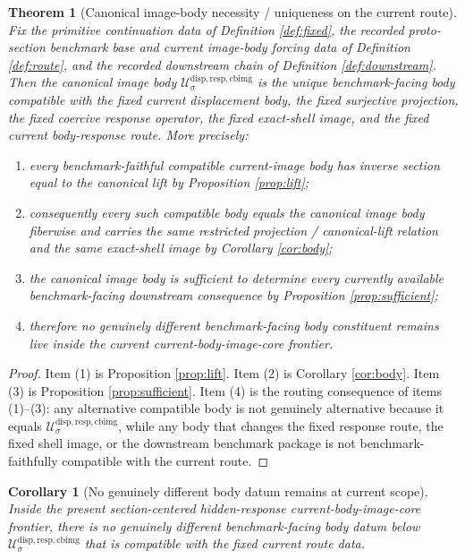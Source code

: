 \documentclass[11pt]{article}
\newcommand{\CanonicalImageBody}[1]{\mathcal U_{#1}^{\mathrm{disp,resp,cbimg}}}
\newtheorem{corollary}{Corollary}
\newtheorem{theorem}{Theorem}
\begin{document}
\begin{theorem}[Canonical image-body necessity / uniqueness on the current route]
\label{thm:main}
Fix the primitive continuation data of Definition \ref{def:fixed}, the recorded proto-section benchmark base and current image-body forcing data of Definition \ref{def:route}, and the recorded downstream chain of Definition \ref{def:downstream}. Then the canonical image body \(\CanonicalImageBody{\sigma}\) is the unique benchmark-facing body compatible with the fixed current displacement body, the fixed surjective projection, the fixed coercive response operator, the fixed exact-shell image, and the fixed current body-response route. More precisely:
\begin{enumerate}
    \item every benchmark-faithful compatible current-image body has inverse section equal to the canonical lift by Proposition \ref{prop:lift};
    \item consequently every such compatible body equals the canonical image body fiberwise and carries the same restricted projection / canonical-lift relation and the same exact-shell image by Corollary \ref{cor:body};
    \item the canonical image body is sufficient to determine every currently available benchmark-facing downstream consequence by Proposition \ref{prop:sufficient};
    \item therefore no genuinely different benchmark-facing body constituent remains live inside the current current-body-image-core frontier.
\end{enumerate}
\end{theorem}

\begin{proof}
Item (1) is Proposition \ref{prop:lift}. Item (2) is Corollary \ref{cor:body}. Item (3) is Proposition \ref{prop:sufficient}. Item (4) is the routing consequence of items (1)--(3): any alternative compatible body is not genuinely alternative because it equals \(\CanonicalImageBody{\sigma}\), while any body that changes the fixed response route, the fixed shell image, or the downstream benchmark package is not benchmark-faithfully compatible with the current route.
\end{proof}

\begin{corollary}[No genuinely different body datum remains at current scope]
\label{cor:minimal}
Inside the present section-centered hidden-response current-body-image-core frontier, there is no genuinely different benchmark-facing body datum below \(\CanonicalImageBody{\sigma}\) that is compatible with the fixed current route data.
\end{corollary}
\end{document}
